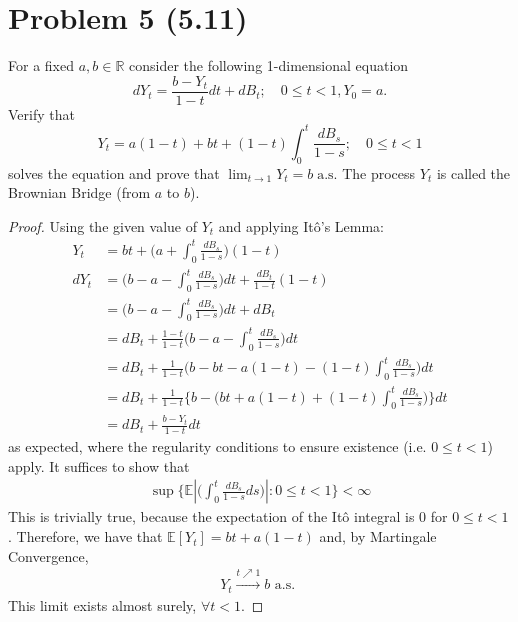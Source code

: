 \documentclass[11pt]{article}
\newcommand{\bbr}{\mathbb{R}}
\newcommand\abs[1]{\left|#1\right|}
\renewcommand{\to}{\longrightarrow}
\newcommand{\E}{\mathbb{E}}
\begin{document}
 \section*{Problem 5 (5.11)}
 For a fixed $a,b \in \bbr$ consider the following 1-dimensional equation $$ d Y _ { t } = \frac { b - Y _ { t } } { 1 - t } d t + d B _ { t } ; \quad 0 \leq t < 1 , Y _ { 0 } = a. $$
Verify that $$Y _ { t } = a ( 1 - t ) + b t + ( 1 - t ) \int _ { 0 } ^ { t } \frac { d B _ { s } } { 1 - s } ; \quad 0 \leq t < 1$$ solves the equation and prove that $\lim_{t \to 1} Y_t=b \; \text{a.s.}$  The process $Y_t$ is called the Brownian Bridge (from $a$ to $b$).
\begin{proof}
Using the given value of $Y_t$ and applying It\^o's Lemma:
\begin{align*}
Y_t &= bt+\Big(a+ \int_0^t \frac{dB_s}{1-s}\Big) (1-t)\\
dY_t &= \Big(b -a-\int_0^t \frac{dB_s}{1-s} \Big) dt + \frac{dB_t}{1-t} (1-t)\\
&= \Big(b -a-\int_0^t \frac{dB_s}{1-s} \Big) dt + dB_t\\
&= dB_t + \frac{1-t}{1-t}\Big(b -a-\int_0^t \frac{dB_s}{1-s} \Big) dt \\
&= dB_t + \frac{1}{1-t}\Big(b-bt -a(1-t) -(1-t)\int_0^t \frac{dB_s}{1-s}\Big)dt \\
&= dB_t + \frac{1}{1-t}\Big\{b-\Big(bt +a(1-t) +(1-t)\int_0^t \frac{dB_s}{1-s}\Big)\Big\}dt \\
&= dB_t +\frac{b-Y_t}{1-t}dt
\end{align*}
as expected, where the regularity conditions to ensure existence (i.e. $0 \leq t < 1$) apply.  It suffices to show that 
\begin{align*}
\sup \Big\{ \E \abs{\Big( \int_0^t \frac{dB_s}{1-s} ds \Big)}: 0\leq t <1 \Big\}<\infty
\end{align*}
This is trivially true, because the expectation of the It\^o integral is $0$ for $0\leq t<1$.  Therefore, we have that $\E [Y_t] = bt+a(1-t)$ and, by Martingale Convergence, 
\begin{align*}
Y_t \xrightarrow{ t \nearrow 1} b \text{ a.s. }
\end{align*}
This limit exists almost surely, $\forall t<1$.
\end{proof}
\end{document}
